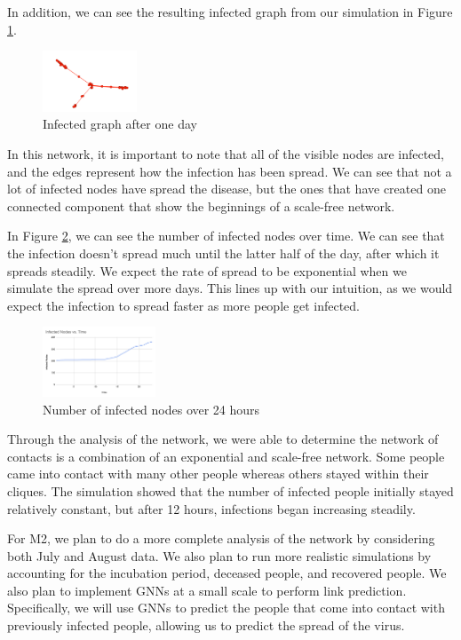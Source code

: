 \documentclass[times, 10pt,twocolumn]{article}
\begin{document}
In addition, we can see the resulting infected graph from our simulation in Figure \ref{fig:my_label2}.
\begin{figure}
    \centering
    \includegraphics[width=0.25\textwidth]{imgs/simulation.png}
    \caption{Infected graph after one day}
    \label{fig:my_label2}
\end{figure}
In this network, it is important to note that all of the visible nodes are infected, and the edges represent how the infection has been spread. We can see that not a lot of infected nodes have spread the disease, but the ones that have created one connected component that show the beginnings of a scale-free network. 

In Figure \ref{fig:my_label3}, we can see the number of infected nodes over time. We can see that the infection doesn't spread much until the latter half of the day, after which it spreads steadily. We expect the rate of spread to be exponential when we simulate the spread over more days. This lines up with our intuition, as we would expect the infection to spread faster as more people get infected.
\begin{figure}
    \centering
    \includegraphics[width=0.30\textwidth]{imgs/infected_over_time.png}
    \caption{Number of infected nodes over 24 hours}
    \label{fig:my_label3}
\end{figure}


Through the analysis of the network, we were able to determine the network of contacts is a combination of an exponential and scale-free network. Some people came into contact with many other people whereas others stayed within their cliques. The simulation showed that the number of infected people initially stayed relatively constant, but after 12 hours, infections began increasing steadily.

For M2, we plan to do a more complete analysis of the network by considering both July and August data. We also plan to run more realistic simulations by accounting for the incubation period, deceased people, and recovered people. We also plan to implement GNNs at a small scale to perform link prediction. Specifically, we will use GNNs to predict the people that come into contact with previously infected people, allowing us to predict the spread of the virus.
\end{document}
